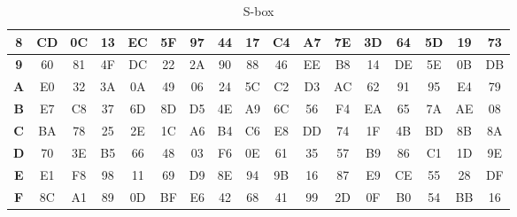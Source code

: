 \documentclass[peerreview]{IEEEtran}
\begin{document}
\begin{table}[ht]
{\begin{tabular}{|c|c|c|c|c|c|c|c|c|c|c|c|c|c|c|c|c|}
\textbf{8} & CD         & 0C         & 13         & EC         & 5F         & 97         & 44         & 17         & C4         & A7         & 7E         & 3D         & 64         & 5D         & 19         & 73         \\ \hline
\textbf{9} & 60         & 81         & 4F         & DC         & 22         & 2A         & 90         & 88         & 46         & EE         & B8         & 14         & DE         & 5E         & 0B         & DB         \\ \hline
\textbf{A} & E0         & 32         & 3A         & 0A         & 49         & 06         & 24         & 5C         & C2         & D3         & AC         & 62         & 91         & 95         & E4         & 79         \\ \hline
\textbf{B} & E7         & C8         & 37         & 6D         & 8D         & D5         & 4E         & A9         & 6C         & 56         & F4         & EA         & 65         & 7A         & AE         & 08         \\ \hline
\textbf{C} & BA         & 78         & 25         & 2E         & 1C         & A6         & B4         & C6         & E8         & DD         & 74         & 1F         & 4B         & BD         & 8B         & 8A         \\ \hline
\textbf{D} & 70         & 3E         & B5         & 66         & 48         & 03         & F6         & 0E         & 61         & 35         & 57         & B9         & 86         & C1         & 1D         & 9E         \\ \hline
\textbf{E} & E1         & F8         & 98         & 11         & 69         & D9         & 8E         & 94         & 9B         & 16         & 87         & E9         & CE         & 55         & 28         & DF         \\ \hline
\textbf{F} & 8C         & A1         & 89         & 0D         & BF         & E6         & 42         & 68         & 41         & 99         & 2D         & 0F         & B0         & 54         & BB         & 16         \\ \hline
\end{tabular}
}
\caption{S-box}
\label{tab:cuadro4}
\end{table}
\end{document}
